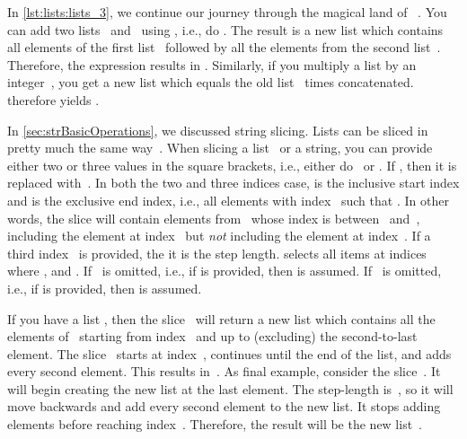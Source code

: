 In \cref{lst:lists:lists_3}, we continue our journey through the magical land of \python\ .
You can add two lists~ and~ using \pythonilIdx{+}, i.e., do .
The result is a new list which contains all elements of the first list~ followed by all the elements from the second list~.
Therefore, the expression \pythonil{[1, 2, 3, 4] + [5, 6, 7]} results in \pythonil{[1, 2, 3, 4, 5, 6, 7]}.
Similarly, if you multiply a list by an integer~, you get a new list which equals the old list ~times concatenated.
 therefore yields \pythonil{[5, 6, 7, 5, 6, 7, 5, 6, 7]}.

In \cref{sec:strBasicOperations}, we discussed string slicing.
Lists can be sliced in pretty much the same way~\cite{PSF:P3D:TPLR:S}.
When slicing a list~ or a string, you can provide either two or three values in the square brackets\pythonIdx{[\idxdots]}\pythonIdx{[i:j:k]}, i.e., either do~\pythonIdx{[i:j]} or .
If , then it is replaced with~.
In both the two and three indices case,  is the inclusive start index and  is the exclusive end index, i.e., all elements with index~ such that .
In other words, the slice will contain elements from~ whose index is between~ and~, including the element at index~ but \emph{not} including the element at index~.
If a third index~ is provided, the it is the step length.
 selects all items at indices~ where ,  and .
If~ is omitted, i.e., if  is provided, then  is assumed.
If~ is omitted, i.e., if  is provided, then  is assumed.

If you have a list , then the slice~ will return a new list which contains all the elements of~ starting from index~ and up to (excluding) the second-to-last element.
The slice~ starts at index~, continues until the end of the list, and adds every second element.
This results in~\pythonil{[6, 5, 7, 6]}.
As final example, consider the slice~.
It will begin creating the new list at the last element.
The step-length is~, so it will move backwards and add every second element to the new list.
It stops adding elements before reaching index~.
Therefore, the result will be the new list~.

